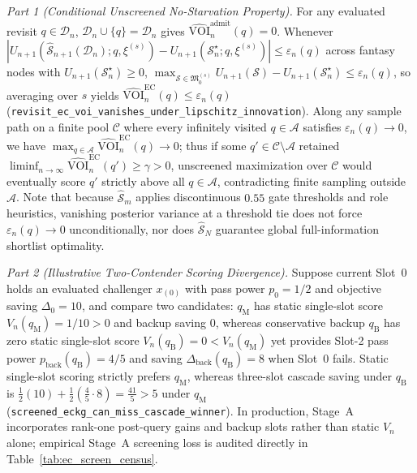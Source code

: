 \emph{Part 1 (Conditional Unscreened No-Starvation Property).} For any evaluated revisit $q \in \mathcal{D}_n$, $\mathcal{D}_n \cup \{q\} = \mathcal{D}_n$ gives $\widehat{\mathrm{VOI}}_n^{\mathrm{admit}}(q) = 0$. Whenever $|U_{n+1}(\hat{\mathcal{S}}_{n+1}(\mathcal{D}_n); q, \xi^{(s)}) - U_{n+1}(\mathcal{S}_n^\star; q, \xi^{(s)})| \le \varepsilon_n(q)$ across fantasy nodes with $U_{n+1}(\mathcal{S}_n^\star) \ge 0$, $\max_{\mathcal{S} \in \mathfrak{M}_0^{(s)}} U_{n+1}(\mathcal{S}) - U_{n+1}(\mathcal{S}_n^\star) \le \varepsilon_n(q)$, so averaging over $s$ yields $\widehat{\mathrm{VOI}}_n^{\mathrm{EC}}(q) \le \varepsilon_n(q)$ (\texttt{revisit\_ec\_voi\_vanishes\_under\_lipschitz\_innovation}). Along any sample path on a finite pool $\mathcal{C}$ where every infinitely visited $q \in \mathcal{A}$ satisfies $\varepsilon_n(q) \to 0$, we have $\max_{q \in \mathcal{A}} \widehat{\mathrm{VOI}}_n^{\mathrm{EC}}(q) \to 0$; thus if some $q' \in \mathcal{C} \setminus \mathcal{A}$ retained $\liminf_{n \to \infty}\widehat{\mathrm{VOI}}_n^{\mathrm{EC}}(q') \ge \gamma > 0$, unscreened maximization over $\mathcal{C}$ would eventually score $q'$ strictly above all $q \in \mathcal{A}$, contradicting finite sampling outside $\mathcal{A}$. Note that because $\hat{\mathcal{S}}_m$ applies discontinuous $0.55$ gate thresholds and role heuristics, vanishing posterior variance at a threshold tie does not force $\varepsilon_n(q) \to 0$ unconditionally, nor does $\hat{\mathcal{S}}_N$ guarantee global full-information shortlist optimality.

\emph{Part 2 (Illustrative Two-Contender Scoring Divergence).} Suppose current Slot~$0$ holds an evaluated challenger $x_{(0)}$ with pass power $p_0 = 1/2$ and objective saving $\Delta_0 = 10$, and compare two candidates: $q_{\mathrm{M}}$ has static single-slot score $V_n(q_{\mathrm{M}}) = 1/10 > 0$ and backup saving $0$, whereas conservative backup $q_{\mathrm{B}}$ has zero static single-slot score $V_n(q_{\mathrm{B}}) = 0 < V_n(q_{\mathrm{M}})$ yet provides Slot-2 pass power $p_{\mathrm{back}}(q_{\mathrm{B}}) = 4/5$ and saving $\Delta_{\mathrm{back}}(q_{\mathrm{B}}) = 8$ when Slot~$0$ fails. Static single-slot scoring strictly prefers $q_{\mathrm{M}}$, whereas three-slot cascade saving under $q_{\mathrm{B}}$ is $\frac{1}{2}(10) + \frac{1}{2}(\frac{4}{5}\cdot 8) = \frac{41}{5} > 5$ under $q_{\mathrm{M}}$ (\texttt{screened\_eckg\_can\_miss\_cascade\_winner}). In production, Stage~A incorporates rank-one post-query gains and backup slots rather than static $V_n$ alone; empirical Stage~A screening loss is audited directly in Table~\ref{tab:ec_screen_census}.
\Halmos\endproof

